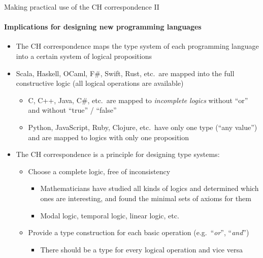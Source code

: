 \documentclass[english]{beamer}
\begin{document}
\begin{frame}{Making practical use of the CH correspondence II}


\framesubtitle{Implications for designing new programming languages}
\begin{itemize}
\item The CH correspondence maps the type system of each programming language
into a certain system of logical propositions 
\item Scala, Haskell, OCaml, F\#, Swift, Rust, etc.~are mapped into the
full constructive logic (all logical operations are available)
\begin{itemize}
\item C, C++, Java, C\#, etc.~are mapped to \emph{incomplete} \emph{logics}
\textendash{} without ``or'' and without ``true'' / ``false''
\item Python, JavaScript, Ruby, Clojure, etc.~have only one type (``any
value'') and are mapped to logics with only one proposition
\end{itemize}
\item The CH correspondence is a principle for designing type systems:
\begin{itemize}
\item Choose a complete logic, free of inconsistency
\begin{itemize}
\item Mathematicians have studied all kinds of logics and determined which
ones are interesting, and found the minimal sets of axioms for them
\item Modal logic, temporal logic, linear logic, etc.
\end{itemize}
\item Provide a type construction for each basic operation (e.g.~``\emph{or}'',
``\emph{and}'')
\begin{itemize}
\item There should be a type for every logical operation and vice versa
\end{itemize}
\end{itemize}
\end{itemize}
\end{frame}
\end{document}
